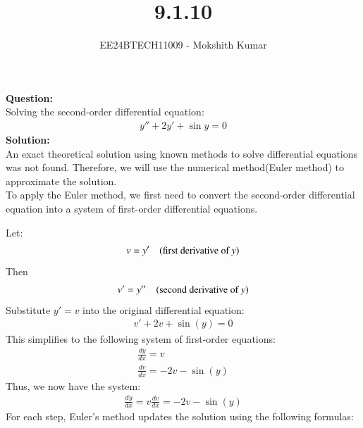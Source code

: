 \documentclass[journal]{IEEEtran}
\begin{document}

\vspace{3cm}

\title{9.1.10}
\author{EE24BTECH11009 - Mokshith Kumar}
\maketitle

\textbf{Question:}\\
Solving the second-order differential equation:
\begin{align}
y'' + 2y' + \sin{y} = 0
\end{align}
\textbf{Solution:}\\
An exact theoretical solution using known methods to solve differential equations was not found. Therefore, we will use the numerical method(Euler method) to approximate the solution.\\

To apply the Euler method, we first need to convert the second-order differential equation into a system of first-order differential equations.

Let:
\begin{align}
v = y' \quad \text{(first derivative of \( y \))}\\
\end{align}
Then
\begin{align}
v' = y'' \quad \text{(second derivative of \( y \))}
\end{align}
Substitute \( y' = v \) into the original differential equation:
\begin{align}
v' + 2v + \sin(y) = 0
\end{align}
This simplifies to the following system of first-order equations:
\begin{align}
\frac{dy}{dx} = v\\
\frac{dv}{dx} = -2v - \sin(y)
\end{align}
Thus, we now have the system:
\begin{align}
\frac{dy}{dx} = v
\frac{dv}{dx} = -2v - \sin(y)
\end{align}
For each step, Euler's method updates the solution using the following formulas:
\end{document}
